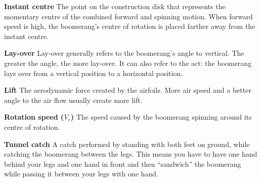 \vspace{0.45em}
\noindent\textbf{Instant centre} The point on the construction disk that represents the momentary centre of the combined forward and spinning motion. When forward speed is high, the boomerang's centre of rotation is placed farther away from the instant centre.

\vspace{0.45em}
\noindent\textbf{Lay-over} Lay-over generally refers to the boomerang's angle to vertical. The greater the angle, the more lay-over. It can also refer to the act: the boomerang lays over from a vertical position to a horizontal position.

\vspace{0.45em}
\noindent\textbf{Lift} The aerodynamic force created by the airfoils. More air speed and a better angle to the air flow usually create more lift.

\vspace{0.45em}
\noindent\textbf{Rotation speed ($V_r$)} The speed caused by the boomerang spinning around its centre of rotation.

\vspace{0.45em}
\noindent\textbf{Tunnel catch} A catch performed by standing with both feet on ground, while catching the boomerang between the legs. This means you have to have one hand behind your legs and one hand in front and then ``sandwich'' the boomerang while passing it between your legs with one hand. 
